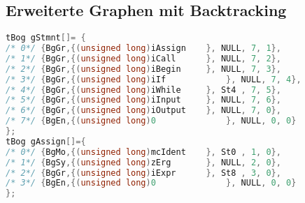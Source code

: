 \subsection{Erweiterte Graphen mit Backtracking}
\begin{lstlisting}[language=C]
tBog gStmnt[]= { 
/* 0*/ {BgGr,{(unsigned long)iAssign	}, NULL, 7, 1},
/* 1*/ {BgGr,{(unsigned long)iCall 		}, NULL, 7, 2},
/* 2*/ {BgGr,{(unsigned long)iBegin 	}, NULL, 7, 3},
/* 3*/ {BgGr,{(unsigned long)iIf 			}, NULL, 7, 4},
/* 4*/ {BgGr,{(unsigned long)iWhile 	}, St4 , 7, 5},
/* 5*/ {BgGr,{(unsigned long)iInput 	}, NULL, 7, 6},
/* 6*/ {BgGr,{(unsigned long)iOutput	}, NULL, 7, 0},
/* 7*/ {BgEn,{(unsigned long)0 				}, NULL, 0, 0}
};
tBog gAssign[]={
/* 0*/ {BgMo,{(unsigned long)mcIdent	}, St0 , 1, 0},
/* 1*/ {BgSy,{(unsigned long)zErg 		}, NULL, 2, 0},
/* 2*/ {BgGr,{(unsigned long)iExpr 		}, St8 , 3, 0},
/* 3*/ {BgEn,{(unsigned long)0 				}, NULL, 0, 0}
};
\end{lstlisting}





